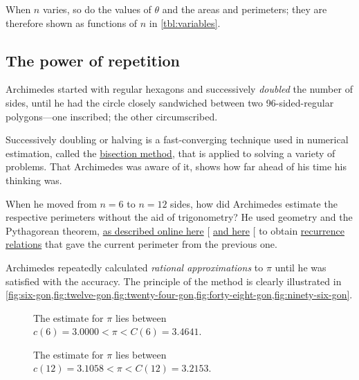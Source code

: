\documentclass[
  a4paper,
]{article}
\begin{document}
When \(n\) varies, so do the values of \(\theta\) and the areas and
perimeters; they are therefore shown as functions of \(n\) in
\cref{tbl:variables}.

\subsection{The power of repetition}\label{the-power-of-repetition}

Archimedes started with regular hexagons and successively \emph{doubled}
the number of sides, until he had the circle closely sandwiched between
two 96-sided-regular polygons---one inscribed; the other circumscribed.

Successively doubling or halving is a fast-converging technique used in
numerical estimation, called the
\href{https://en.wikipedia.org/wiki/Bisection_method}{bisection method},
that is applied to solving a variety of problems. That Archimedes was
aware of it, shows how far ahead of his time his thinking was.

When he moved from \(n=6\) to \(n = 12\) sides, how did Archimedes
estimate the respective perimeters without the aid of trigonometry? He
used geometry and the Pythagorean theorem,
\href{https://nonagon.org/ExLibris/archimedes-pi}{as described online
here} {[}\citeproc{ref-bertrand2014}{2}{]}
\href{https://publications.azimpremjiuniversity.edu.in/3356/1/02-DaminiAndAbhishek_PiIs22By7_Final.pdf}{and
here} {[}\citeproc{ref-damini-dhar-2020}{3}{]} to obtain
\href{https://en.wikipedia.org/wiki/Recurrence_relation}{recurrence
relations} that gave the current perimeter from the previous one.

Archimedes repeatedly calculated \emph{rational approximations} to
\(\pi\) until he was satisfied with the accuracy. The principle of the
method is clearly illustrated in
\cref{fig:six-gon,fig:twelve-gon,fig:twenty-four-gon,fig:forty-eight-gon,fig:ninety-six-gon}.

\begin{figure}
\centering

\caption{The estimate for \(\pi\) lies between
\(c(6) = 3.0000 < \pi < C(6) = 3.4641\).}\label{fig:six-gon}
\end{figure}

\begin{figure}
\centering

\caption{The estimate for \(\pi\) lies between
\(c(12) = 3.1058 < \pi < C(12) = 3.2153\).}\label{fig:twelve-gon}
\end{figure}
\end{document}
